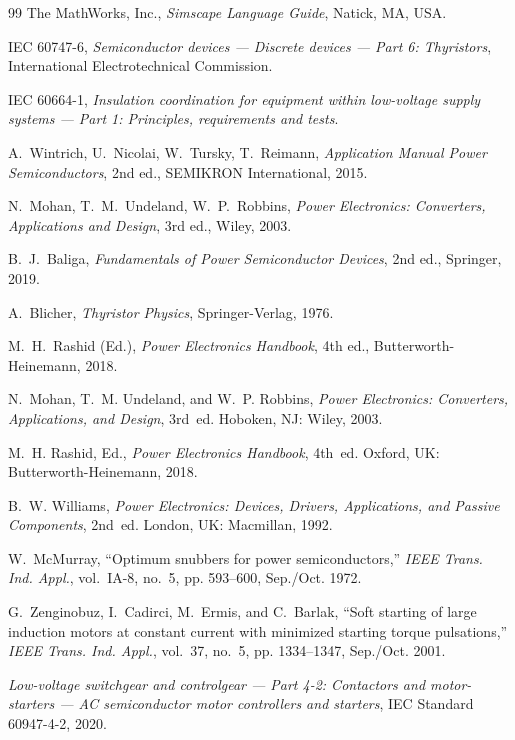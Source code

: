 \begin{thebibliography}{99}
 The MathWorks, Inc., \emph{Simscape Language Guide}, Natick, MA, USA.

 IEC 60747-6, \emph{Semiconductor devices --- Discrete devices --- Part 6: Thyristors}, International Electrotechnical Commission.

 IEC 60664-1, \emph{Insulation coordination for equipment within low-voltage supply systems --- Part 1: Principles, requirements and tests}.

 A.~Wintrich, U.~Nicolai, W.~Tursky, T.~Reimann, \emph{Application Manual Power Semiconductors}, 2nd ed., SEMIKRON International, 2015.

 N.~Mohan, T.~M.~Undeland, W.~P.~Robbins, \emph{Power Electronics: Converters, Applications and Design}, 3rd ed., Wiley, 2003.

 B.~J.~Baliga, \emph{Fundamentals of Power Semiconductor Devices}, 2nd ed., Springer, 2019.

 A.~Blicher, \emph{Thyristor Physics}, Springer-Verlag, 1976.

 M.~H.~Rashid (Ed.), \emph{Power Electronics Handbook}, 4th ed., Butterworth-Heinemann, 2018.

 N.~Mohan, T.~M. Undeland, and W.~P. Robbins, \emph{Power Electronics: Converters, Applications, and Design}, 3rd~ed. Hoboken, NJ: Wiley, 2003.

 M.~H. Rashid, Ed., \emph{Power Electronics Handbook}, 4th~ed. Oxford, UK: Butterworth-Heinemann, 2018.

 B.~W. Williams, \emph{Power Electronics: Devices, Drivers, Applications, and Passive Components}, 2nd~ed. London, UK: Macmillan, 1992.

 W.~McMurray, ``Optimum snubbers for power semiconductors,'' \emph{IEEE Trans. Ind. Appl.}, vol.~IA-8, no.~5, pp. 593--600, Sep./Oct. 1972.

 G.~Zenginobuz, I.~Cadirci, M.~Ermis, and C.~Barlak, ``Soft starting of large induction motors at constant current with minimized starting torque pulsations,'' \emph{IEEE Trans. Ind. Appl.}, vol.~37, no.~5, pp. 1334--1347, Sep./Oct. 2001.

 \emph{Low-voltage switchgear and controlgear --- Part 4-2: Contactors and motor-starters --- AC semiconductor motor controllers and starters}, IEC Standard 60947-4-2, 2020.


\end{thebibliography}
